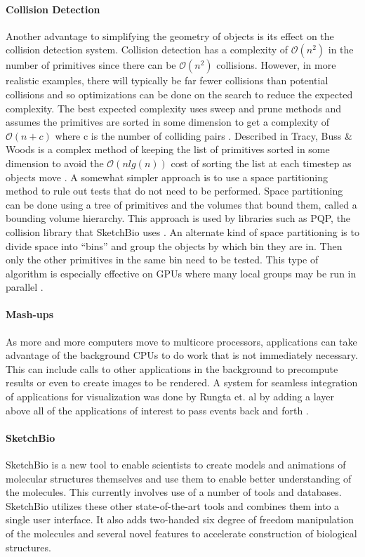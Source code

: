 \documentclass{article} %
\begin{document}
\paragraph{Collision Detection}
Another advantage to simplifying the geometry of objects is its effect on the collision detection system.  Collision detection has a complexity of $\mathcal{O}(n^2)$ in the number of primitives since there can be $\mathcal{O}(n^2)$ collisions.  However, in more realistic examples, there will typically be far fewer collisions than potential collisions and so optimizations can be done on the search to reduce the expected complexity.  The best expected complexity uses sweep and prune methods and assumes the primitives are sorted in some dimension to get a complexity of $\mathcal{O}(n + c)$ where c is the number of colliding pairs \cite{tracy2009efficient}.  Described in Tracy, Buss \& Woods is a complex method of keeping the list of primitives sorted in some dimension to avoid the $\mathcal{O}(n lg(n))$ cost of sorting the list at each timestep as objects move \cite{tracy2009efficient}.  A somewhat simpler approach is to use a space partitioning method to rule out tests that do not need to be performed.  Space partitioning can be done using a tree of primitives and the volumes that bound them, called a bounding volume hierarchy.  This approach is used by libraries such as PQP, the collision library that SketchBio uses \cite{PQP}.  An alternate kind of space partitioning is to divide space into “bins” and group the objects by which bin they are in.  Then only the other primitives in the same bin need to be tested.  This type of algorithm is especially effective on GPUs where many local groups may be run in parallel \cite{oat2008efficient}.

\paragraph{Mash-ups}
As more and more computers move to multicore processors, applications can take advantage of the background CPUs to do work that is not immediately necessary.  This can include calls to other applications in the background to precompute results or even to create images to be rendered.  A system for seamless integration of applications for visualization was done by Rungta et. al by adding a layer above all of the applications of interest to pass events back and forth \cite{rungta2013manyvis}.

\paragraph{SketchBio}
SketchBio is a new tool to enable scientists to create models and animations of molecular structures themselves and use them to enable better understanding of the molecules.  This currently involves use of a number of tools and databases.  SketchBio utilizes these other state-of-the-art tools and combines them into a single user interface.  It also adds two-handed six degree of freedom manipulation of the molecules and several novel features to accelerate construction of biological structures.
\end{document}
